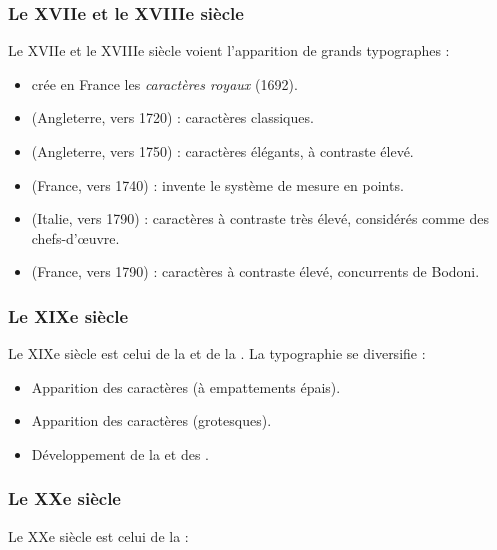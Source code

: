 \subsubsection{Le XVIIe et le XVIIIe siècle}

Le XVIIe et le XVIIIe siècle voient l'apparition de grands typographes :

\begin{itemize}
    \item {} crée en France les \emph{caractères royaux} (1692).
    \item {} (Angleterre, vers 1720) : caractères classiques.
    \item {} (Angleterre, vers 1750) : caractères élégants, à contraste élevé.
    \item {} (France, vers 1740) : invente le système de mesure en points.
    \item {} (Italie, vers 1790) : caractères à contraste très élevé, considérés comme des chefs-d'œuvre.
    \item {} (France, vers 1790) : caractères à contraste élevé, concurrents de Bodoni.
\end{itemize}

\subsubsection{Le XIXe siècle}

Le XIXe siècle est celui de la  et de la . La typographie se diversifie :

\begin{itemize}
    \item Apparition des caractères  (à empattements épais).
    \item Apparition des caractères  (grotesques).
    \item Développement de la  et des .
\end{itemize}

\subsubsection{Le XXe siècle}

Le XXe siècle est celui de la  :

